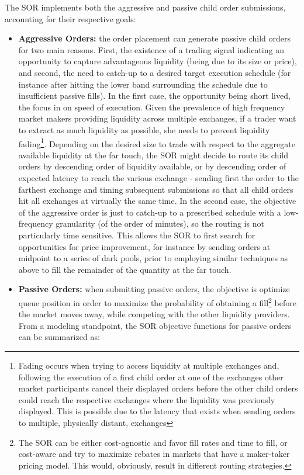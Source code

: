 The SOR implements both the aggressive and passive child order submissions, accounting for their respective goals:
\begin{itemize}
\item \textbf{Aggressive Orders:} the order placement can generate passive child orders for two main reasons. First, the existence of a trading signal indicating an opportunity to capture advantageous liquidity (being due to its size or price), and second, the need to catch-up to a desired target execution schedule (for instance after hitting the lower band surrounding the schedule due to insufficient passive fills). In the first case, the opportunity being short lived, the focus in on speed of execution. Given the prevalence of high frequency market makers providing liquidity across multiple exchanges, if a trader want to extract as much liquidity as possible, she needs to prevent liquidity fading\footnote{Fading occurs when trying to access liquidity at multiple exchanges and, following the execution of a first child order at one of the exchanges other market participants cancel their displayed orders before the other child orders could reach the respective exchanges where the liquidity was previously displayed. This is possible due to the latency that exists when sending orders to multiple, physically distant, exchanges}. Depending on the desired size to trade with respect to the aggregate available liquidity at the far touch, the SOR might decide to route its child orders by descending order of liquidity available, or by descending order of expected latency to reach the various exchange - sending first the order to the farthest exchange and timing subsequent submissions so that all child orders hit all exchanges at virtually the same time. 
In the second case, the objective of the aggressive order is just to catch-up to a prescribed schedule with a low-frequency granularity (of the order of minutes), so the routing is not particularly time sensitive. This allows the SOR to first search for opportunities for price improvement, for instance by sending orders at midpoint to a series of dark pools, prior to employing similar techniques as above to fill the remainder of the quantity at the far touch.
\item \textbf{Passive Orders:} when submitting passive orders, the objective is optimize queue position in order to maximize the probability of obtaining a fill\footnote{The SOR can be either cost-agnostic and favor fill rates and time to fill, or cost-aware and try to maximize rebates in markets that have a maker-taker pricing model. This would, obviously, result in different routing strategies.} before the market moves away, while competing with the other liquidity providers. From a modeling standpoint, the SOR objective functions for passive orders can be summarized as:

\end{itemize}
